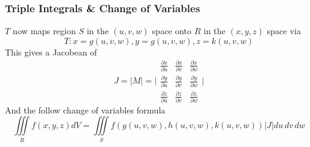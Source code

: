 \documentclass{beamer}
\begin{document}
\begin{frame}
\frametitle{Triple Integrals \& Change of Variables}
$T$ now maps region $S$ in the $(u,v,w)$ space onto $R$ in the $(x,y,z)$ space via
$$T: x=g(u,v,w),y=g(u,v,w),z=k(u,v,w)$$
This gives a Jacobean of 
$$J=|M| = \Bigg|\begin{matrix}
\frac{\partial x}{\partial u} & \frac{\partial x}{\partial v} & \frac{\partial x}{\partial w}\\
\frac{\partial y}{\partial u} & \frac{\partial y}{\partial v} & \frac{\partial y}{\partial w}\\
\frac{\partial z}{\partial u} & \frac{\partial z}{\partial v} & \frac{\partial z}{\partial w}
\end{matrix} \Bigg|$$
And the follow change of variables formula
$$\iiint\limits_{R} f(x,y,z)dV = \iiint\limits_{S} f(g(u,v,w),h(u,v,w),k(u,v,w)) |J| du\, dv\, dw$$
\end{frame}
\end{document}

